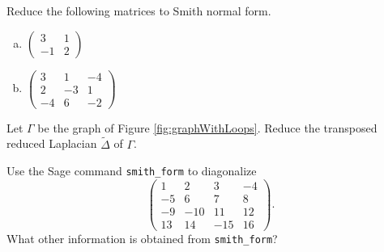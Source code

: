 \documentclass[../algebraNotesMSRI-UP2016.tex]{subfiles}
\begin{document}
\begin{frame}[c]{}{}
\begin{exe}[cf. Problem 76]\label{exe:prob76}
Reduce the following matrices to Smith normal form. 
\begin{enumerate}[(a)]
\item $\begin{pmatrix}	
	3 & 1 \\
	-1 & 2
	\end{pmatrix}$
\item $\begin{pmatrix}
	3 & 1 & -4 \\
	2 & -3 & 1 \\
	-4 & 6 & -2
	\end{pmatrix}$
%	
\end{enumerate}
\end{exe}
\end{frame}

\begin{frame}[c]{}{}
\begin{exe}[cf. Problem 77]\label{exe:prob77}
Let $\Gamma$ be the graph of Figure \ref{fig:graphWithLoops}.  %
  Reduce the transposed reduced Laplacian $\tilde{\Delta}$ of $\Gamma$.
\end{exe}
\end{frame}
 
\begin{frame}[fragile,c]{}{}
\begin{exe}[cf. Problem 78]\label{exe:prob78}
Use the Sage command \verb|smith_form| to diagonalize
\[
\begin{pmatrix}
1 & 2 & 3 & -4 \\
-5 & 6 & 7 & 8 \\
-9 & -10 & 11 & 12 \\
13 & 14 & -15 & 16
\end{pmatrix}.
\]
What other information is obtained from \verb|smith_form|?
\end{exe}
\end{frame}

\begin{comment}
\answerKey
\begin{frame}{\subsecname}
\exeSol{exe:uniqueSum}
\end{frame}

\begin{frame}
\exeSol[(cf. Problem 76)]{exe:prob76}
\end{frame}

\begin{frame}
\exeSol[(cf. Problem 77)]{exe:prob77}
\end{frame}

\begin{frame}
\exeSol[(cf. Problem 78)]{exe:prob78}
\end{frame}

\end{comment}
\end{document}
